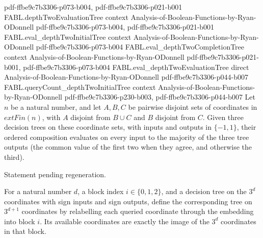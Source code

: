 \begin{theorem}
  {pdf-ffbe9c7b3306-p073-b004,
    pdf-ffbe9c7b3306-p021-b001}
\proofstep
  {FABL.depthTwoEvaluationTree}
  {context}
  {Analysis-of-Boolean-Functions-by-Ryan-ODonnell}
  {pdf-ffbe9c7b3306-p073-b004,
    pdf-ffbe9c7b3306-p021-b001}
\proofstep
  {FABL.eval_depthTwoInitialTree}
  {context}
  {Analysis-of-Boolean-Functions-by-Ryan-ODonnell}
  {pdf-ffbe9c7b3306-p073-b004}
\proofstep
  {FABL.eval_depthTwoCompletionTree}
  {context}
  {Analysis-of-Boolean-Functions-by-Ryan-ODonnell}
  {pdf-ffbe9c7b3306-p021-b001,
    pdf-ffbe9c7b3306-p073-b004}
\proofstep
  {FABL.eval_depthTwoEvaluationTree}
  {direct}
  {Analysis-of-Boolean-Functions-by-Ryan-ODonnell}
  {pdf-ffbe9c7b3306-p044-b007}
\proofstep
  {FABL.queryCount_depthTwoInitialTree}
  {context}
  {Analysis-of-Boolean-Functions-by-Ryan-ODonnell}
  {pdf-ffbe9c7b3306-p230-b003,
    pdf-ffbe9c7b3306-p044-b007}
Let $n$ be a natural number, and let $A,B,C$ be pairwise disjoint sets of coordinates in
$	ext{Fin}(n)$, with $A$ disjoint from $B\cup C$ and $B$ disjoint from $C$. Given three
decision trees on these coordinate sets, with inputs and outputs in $\{ -1,1\}$, their
ordered composition evaluates on every input to the majority of the three tree outputs
(the common value of the first two when they agree, and otherwise the third).
\end{theorem}

\begin{theorem}
\label{FABL.queryCount_orderedMajorityThreeTree}
\leanok
{}
Statement pending regeneration.
\end{theorem}

\begin{definition}
\label{FABL.recursiveMajorityThreeTreeInBlock}
\leanok
{}
For a natural number $d$, a block index $i\in\{0,1,2\}$, and a decision tree on the
$3^d$ coordinates with sign inputs and sign outputs, define the corresponding tree on
$3^{d+1}$ coordinates by relabelling each queried coordinate through the embedding into
block $i$. Its available coordinates are exactly the image of the $3^d$ coordinates in
that block.
\end{definition}

